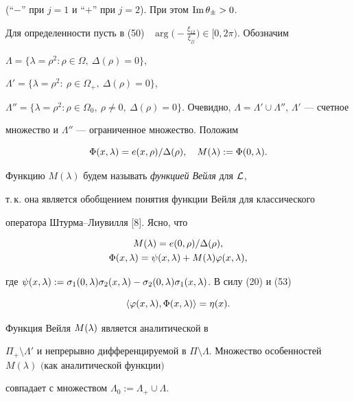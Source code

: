 (``$-$'' при $j=1$ и ``$+$'' при $j=2$). При этом $\operatorname{Im}\theta_{\pm}>0$.


Для определенности пусть в (50) \ $\arg\big(-\frac{\xi_{12}}{\xi_{jj}}\big)


\in [0,2\pi)$. Обозначим


$\Lambda=\{\lambda=\rho^2: \rho\in\Omega,\ \Delta(\rho)=0\}$,


$\Lambda'=\{\lambda=\rho^2: \ \rho\in\Omega_{+},\ \Delta(\rho)=0\}$,


$\Lambda''=\{\lambda=\rho^2:\rho\in\Omega_0,\ \rho\ne 0,\ \Delta(\rho)=


0\}$. Очевидно, $\Lambda=\Lambda'\cup\Lambda''$, $\Lambda'$ --- счетное


множество и $\Lambda''$ --- ограниченное множество. Положим


\begin{equation}


\Phi(x,\la)=e(x,\rho)/ \Delta(\rho),\quad M(\la):=\Phi(0,\la).


\end{equation}


Функцию $M(\lambda)$ будем называть {\it функцией Вейля} для ${\cal L}$,


т.\,к. она является обобщением понятия функции Вейля для классического


оператора Штурма--Лиувилля [8]. Ясно, что


\begin{gather}


M(\la)=e(0,\rho)/ \Delta(\rho),\\


%


\Phi(x,\la)=\psi(x,\la)+M(\la)\vv(x,\la),


\end{gather}


где $\psi(x,\la):=\sigma_1(0,\la)\sigma_2(x,\la)-


\sigma_2(0,\la)\sigma_1(x,\la)$. В силу (20) и (53)


\begin{equation}


\langle\vv(x,\la),\Phi(x,\la)\rangle= \eta(x).


\end{equation}





\begin{thm}


Функция Вейля $M(\lambda)$ является аналитической в


$\Pi_{+}\setminus\Lambda'$ и непрерывно дифференцируемой в $\Pi\setminus


\Lambda$. Множество особенностей $M(\lambda)$ $($как аналитической функции$)$


совпадает с множеством $\Lambda_0:=\Lambda_{+}\cup\Lambda$.


\end{thm}





